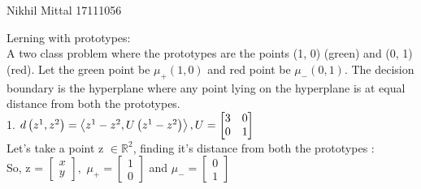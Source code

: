 \documentclass[a4paper,11pt]{article}
\begin{document}
								{Nikhil Mittal}      						           		%
								{17111056}																		%

\begin{mlsolution}

Lerning with prototypes:\\
A two class problem where the prototypes are the points (1, 0) (green) and (0, 1) (red). Let the green point be \begin{math} \mu _{+} (1, 0) \end{math} and red point be \begin{math} \mu _{-} (0, 1) \end{math}. The decision boundary is the hyperplane where any point lying on the hyperplane is at equal distance from both the prototypes.
\\
1.  \begin{math}
 d\left ( z^{1}, \space z^{2} \right ) = \left \langle z^{1} - z^{2}, \space U\left ( z^{1} - z^{2} \right ) \right \rangle, U = \begin{bmatrix} 
3 & 0 \\ 0 & 1 \end{bmatrix} \\ 
\end{math}
\\
Let's take a point z \begin{math} \in \mathbb{R}^{2} \end{math}, finding it's distance from both the prototypes :
\\
So, z = \begin{math}
\begin{bmatrix} x\\ y \end{bmatrix},
\end{math} 
\begin{math}
\mu _{+} = \begin{bmatrix} 1\\ 0 \end{bmatrix} 
\end{math}
and
\begin{math}
\mu _{-} = \begin{bmatrix} 0\\ 1 \end{bmatrix}
\end{math}
\newline
\newline
\begin{math}

\end{math}
\end{mlsolution}
\end{document}
